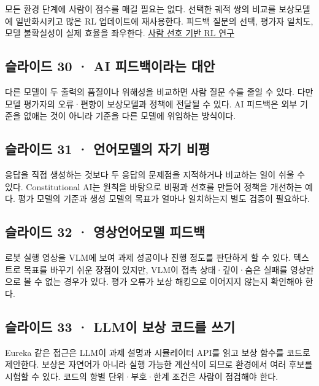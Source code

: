 \documentclass[11pt,a4paper]{article}
\begin{document}
모든 환경 단계에 사람이 점수를 매길 필요는 없다. 선택한 궤적 쌍의 비교를 보상모델에 일반화시키고 많은 RL 업데이트에 재사용한다. 피드백 질문의 선택, 평가자 일치도, 모델 불확실성이 실제 효율을 좌우한다. \href{https://arxiv.org/abs/1706.03741}{사람 선호 기반 RL 연구}\par

\subsection{슬라이드 30 · AI 피드백이라는 대안}

다른 모델이 두 출력의 품질이나 위해성을 비교하면 사람 질문 수를 줄일 수 있다. 다만 모델 평가자의 오류·편향이 보상모델과 정책에 전달될 수 있다. AI 피드백은 외부 기준을 없애는 것이 아니라 기준을 다른 모델에 위임하는 방식이다.\par

\subsection{슬라이드 31 · 언어모델의 자기 비평}

응답을 직접 생성하는 것보다 두 응답의 문제점을 지적하거나 비교하는 일이 쉬울 수 있다. Constitutional AI는 원칙을 바탕으로 비평과 선호를 만들어 정책을 개선하는 예다. 평가 모델의 기준과 생성 모델의 목표가 얼마나 일치하는지 별도 검증이 필요하다.\par

\subsection{슬라이드 32 · 영상언어모델 피드백}

로봇 실행 영상을 VLM에 보여 과제 성공이나 진행 정도를 판단하게 할 수 있다. 텍스트로 목표를 바꾸기 쉬운 장점이 있지만, VLM이 접촉 상태·깊이·숨은 실패를 영상만으로 볼 수 없는 경우가 있다. 평가 오류가 보상 해킹으로 이어지지 않는지 확인해야 한다.\par

\subsection{슬라이드 33 · LLM이 보상 코드를 쓰기}

Eureka 같은 접근은 LLM이 과제 설명과 시뮬레이터 API를 읽고 보상 함수를 코드로 제안한다. 보상은 자연어가 아니라 실행 가능한 계산식이 되므로 환경에서 여러 후보를 시험할 수 있다. 코드의 항별 단위·부호·한계 조건은 사람이 점검해야 한다.\par
\end{document}
